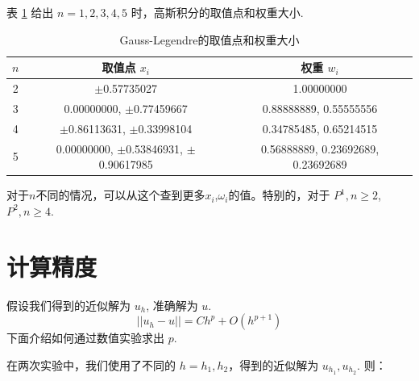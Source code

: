 \documentclass{article}
\numberwithin{equation}{subsection}    %
\begin{document}
\begin{appendix}
    表 \ref{tab:高斯积分} 给出 $n=1,2,3,4,5$ 时，高斯积分的取值点和权重大小.
    \begin{table}[ht]
        \centering
        \caption{Gauss-Legendre的取值点和权重大小}
        \label{tab:高斯积分}
        \begin{tabular}{|c|c|c|}
            \hline
            $n$ & 取值点 $x_i$                                 & 权重 $w_i$                         \\
            \hline
            2   & $\pm$0.57735027                              & 1.00000000                         \\
            \hline
            3   & 0.00000000, $\pm$0.77459667                  & 0.88888889, 0.55555556             \\
            \hline
            4   & $\pm$0.86113631, $\pm$0.33998104             & 0.34785485, 0.65214515             \\
            \hline
            5   & 0.00000000, $\pm$0.53846931, $\pm$0.90617985 & 0.56888889, 0.23692689, 0.23692689 \\
            \hline
        \end{tabular}
    \end{table}
    对于$n$不同的情况，可以从这个\cite{RN106}查到更多$x_i$,$\omega_i$的值。特别的，对于 $P^1,n\geqslant 2$,$P^2,n\geqslant 4$.
    \section{计算精度}
    假设我们得到的近似解为 $u_h$, 准确解为 $u$.
    \begin{equation}
        || u_h-u || = Ch^p + O(h^{p+1})
    \end{equation}
    下面介绍如何通过数值实验求出 $p$.

    在两次实验中，我们使用了不同的 $h=h_1,h_2$，得到的近似解为 $u_{h_1},u_{h_2}$. 则：


\end{appendix}
\end{document}
